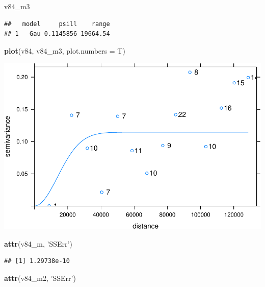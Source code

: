 \documentclass[11pt,]{article}
\newenvironment{Shaded}{\begin{snugshade}}{\end{snugshade}}
\newcommand{\KeywordTok}[1]{\textcolor[rgb]{0.13,0.29,0.53}{\textbf{#1}}}
\newcommand{\DataTypeTok}[1]{\textcolor[rgb]{0.13,0.29,0.53}{#1}}
\newcommand{\StringTok}[1]{\textcolor[rgb]{0.31,0.60,0.02}{#1}}
\newcommand{\NormalTok}[1]{#1}
\begin{document}
\begin{Shaded}
\begin{Highlighting}[]
\NormalTok{v84_m3}
\end{Highlighting}
\end{Shaded}

\begin{verbatim}
##   model     psill    range
## 1   Gau 0.1145856 19664.54
\end{verbatim}

\begin{Shaded}
\begin{Highlighting}[]
\KeywordTok{plot}\NormalTok{(v84, v84_m3, }\DataTypeTok{plot.numbers =}\NormalTok{ T)}
\end{Highlighting}
\end{Shaded}

\includegraphics{proyecto_files/figure-latex/unnamed-chunk-36-3.pdf}

\begin{Shaded}
\begin{Highlighting}[]
\KeywordTok{attr}\NormalTok{(v84_m, }\StringTok{'SSErr'}\NormalTok{)}
\end{Highlighting}
\end{Shaded}

\begin{verbatim}
## [1] 1.29738e-10
\end{verbatim}

\begin{Shaded}
\begin{Highlighting}[]
\KeywordTok{attr}\NormalTok{(v84_m2, }\StringTok{'SSErr'}\NormalTok{)}
\end{Highlighting}
\end{Shaded}
\end{document}
